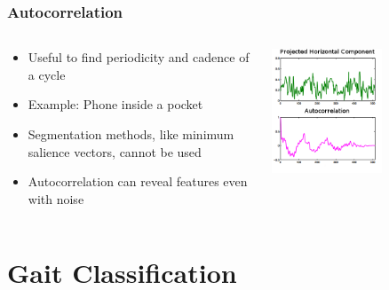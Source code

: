 \documentclass{beamer}
\begin{document}
\begin{frame}
\frametitle{Autocorrelation}
 \begin{columns}
  \begin{column}{.6\textwidth}
  \begin{itemize}
		\item Useful to find periodicity and cadence of a cycle
		\linebreak
		\item Example: Phone inside a pocket
		\linebreak
		\item Segmentation methods, like minimum salience vectors, cannot be used
		\linebreak
		\item Autocorrelation can reveal features even with noise
  \end{itemize}
  \end{column}
  \begin{column}{0.65\textwidth}
   \includegraphics[width=0.6\textwidth]{Illustrations/autocorrelationcd.png}
       \\
  \end{column}
  \end{columns}  
  
\end{frame}
\section[Gait Classification]{Gait Classification}
\end{document}
